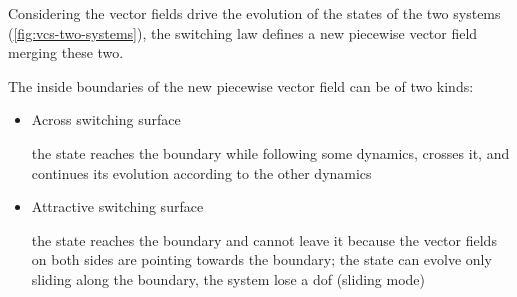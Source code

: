 Considering the vector fields drive the evolution of the states of the two systems (\cref{fig:vcs-two-systems}), the switching law defines a new piecewise vector field merging these two.

The inside boundaries of the new piecewise vector field can be of two kinds:

\begin{itemize}
    \item Across switching surface

    the state reaches the boundary while following some dynamics, crosses it, and continues its evolution according to the other dynamics

    \item Attractive switching surface

    the state reaches the boundary and cannot leave it because the vector fields on both sides are pointing towards the boundary;
    the state can evolve only sliding along the boundary, the system lose a dof (sliding mode)
\end{itemize}
